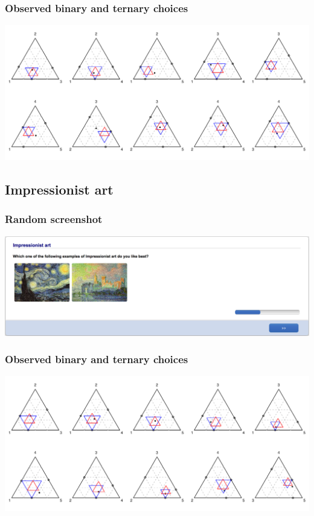 \documentclass[11pt,letter]{article}
\begin{document}
\subsubsection*{Observed binary and ternary choices}

\includegraphics[width=15cm]{./Population_study_data/Simplexes/Aboriginal_art.pdf}

\pagebreak

\subsection{Impressionist art}



\subsubsection*{Random screenshot}

\includegraphics[width=15cm]{Population_study_design/screenshot_Impressionist_Art.png}

\subsubsection*{Observed binary and ternary choices}

\includegraphics[width=15cm]{./Population_study_data/Simplexes/Impressionist_art.pdf}
\end{document}

